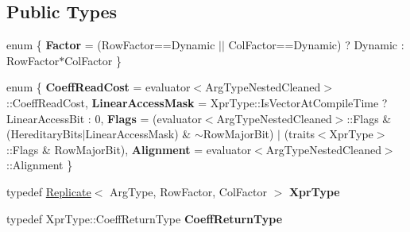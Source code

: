 \subsection*{Public Types}
\begin{DoxyCompactItemize}
\item 
\mbox{\label{struct_eigen_1_1internal_1_1unary__evaluator_3_01_replicate_3_01_arg_type_00_01_row_factor_00_01_col_factor_01_4_01_4_af41e1b94c687ecd205395e6c1124c389}} 
enum \{ {\bfseries Factor} = (Row\+Factor==Dynamic $\vert$$\vert$ Col\+Factor==Dynamic) ? Dynamic \+: Row\+Factor$\ast$\+Col\+Factor
 \}
\item 
\mbox{\label{struct_eigen_1_1internal_1_1unary__evaluator_3_01_replicate_3_01_arg_type_00_01_row_factor_00_01_col_factor_01_4_01_4_a7fd1c4d4344a518746f4940e69e1e7a4}} 
enum \{ {\bfseries Coeff\+Read\+Cost} = evaluator$<$Arg\+Type\+Nested\+Cleaned$>$\+::Coeff\+Read\+Cost, 
{\bfseries Linear\+Access\+Mask} = Xpr\+Type\+::Is\+Vector\+At\+Compile\+Time ? Linear\+Access\+Bit \+: 0, 
{\bfseries Flags} = (evaluator$<$Arg\+Type\+Nested\+Cleaned$>$\+::Flags \& (Hereditary\+Bits$\vert$\+Linear\+Access\+Mask) \& $\sim$\+Row\+Major\+Bit) $\vert$ (traits$<$Xpr\+Type$>$\+::Flags \& Row\+Major\+Bit), 
{\bfseries Alignment} = evaluator$<$Arg\+Type\+Nested\+Cleaned$>$\+::Alignment
 \}
\item 
\mbox{\label{struct_eigen_1_1internal_1_1unary__evaluator_3_01_replicate_3_01_arg_type_00_01_row_factor_00_01_col_factor_01_4_01_4_a51ea76fb4a5f30995352d9a1ac8585d0}} 
typedef \mbox{\hyperlink{class_eigen_1_1_replicate}{Replicate}}$<$ Arg\+Type, Row\+Factor, Col\+Factor $>$ {\bfseries Xpr\+Type}
\item 
\mbox{\label{struct_eigen_1_1internal_1_1unary__evaluator_3_01_replicate_3_01_arg_type_00_01_row_factor_00_01_col_factor_01_4_01_4_a9708d10de38d9593e1b324ff3213b333}} 
typedef Xpr\+Type\+::\+Coeff\+Return\+Type {\bfseries Coeff\+Return\+Type}
$$
\end{DoxyCompactItemize}
